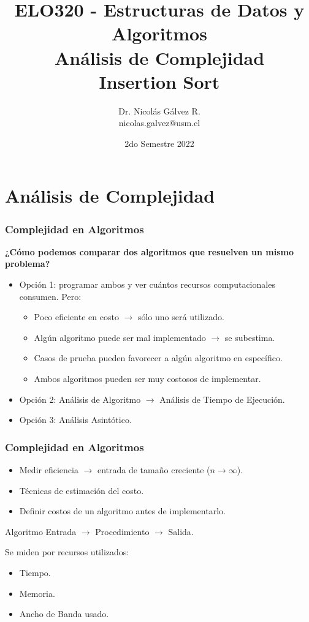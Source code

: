\documentclass{beamer}
\title{ELO320 - Estructuras de Datos y Algoritmos\\Análisis de Complejidad\\\small{Insertion Sort}}
\author{Dr. Nicolás Gálvez R.\\{\small nicolas.galvez@usm.cl}}
\institute{Ing. Civil Telemática - Departamento de Electrónica}
\date{2do Semestre 2022}
\begin{document}
\frame{\titlepage}

%
%

\section{Análisis de Complejidad}
\begin{frame}[fragile]
 \frametitle{Complejidad en Algoritmos}
\small
\textbf{¿Cómo podemos comparar dos algoritmos que resuelven un mismo problema?}

\begin{itemize}
\item Opción 1: programar ambos y ver cuántos recursos computacionales consumen. Pero:
\begin{itemize}
\item Poco eficiente en costo $\rightarrow$ sólo uno será utilizado. 
\item Algún algoritmo puede ser mal implementado $\rightarrow$ se subestima.
\item Casos de prueba pueden favorecer a algún algoritmo en específico.
\item Ambos algoritmos pueden ser muy costosos de implementar.
\end{itemize}
\smallskip
\item Opción 2: Análisis de Algoritmo $\rightarrow$ Análisis de Tiempo de Ejecución.
\item Opción 3: Análisis Asintótico.
\end{itemize}
\end{frame}


\begin{frame}[fragile]
 \frametitle{Complejidad en Algoritmos}
\small
\begin{itemize}
\item Medir eficiencia $\rightarrow$ entrada de tamaño creciente ($n \rightarrow \infty$). 
\item Técnicas de estimación del costo.
\item Definir costos de un algoritmo antes de implementarlo.
\end{itemize}

\begin{block}{Algoritmo}
\medskip
\centering Entrada $\rightarrow$ Procedimiento $\rightarrow$ Salida.
\medskip
\end{block}

Se miden por recursos utilizados:
\begin{itemize}
\item Tiempo.
\item Memoria.
\item Ancho de Banda usado.
\end{itemize}
\end{frame}
\end{document}

